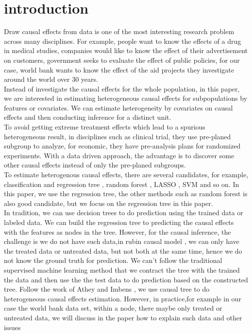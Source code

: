 \section{introduction}

Draw causal effects from data is one of the most interesting  research problem across many disciplines. For example, people want to know the effects of a drug in medical studies, companies would like to know the effect of their advertisement on customers, government seeks to evaluate the effect of public policies, for our case, world bank wants to know the effect of the aid projects they investigate around the world over 30 years. \\
Instead of investigate the causal effects for the whole population, in this paper, we are interested in estimating heterogeneous causal effects for subpopulations by features or covariates. We can estimate heterogeneity by covariates on causal effects and then conducting inference for a distinct unit.\\
To avoid getting extreme treatment effects which lead to a spurious heterogeneous result, in disciplines such as clinical trial, they use pre-planed subgroup to analyze, for economic, they have pre-analysis plans for randomized experiments. With a data driven approach, the advantage is to discover some other causal effects instead of only the pre-planed subgroups.\\
To estimate heterogenous causal effects, there are several candidates, for example, classification and regression tree  \cite{Breiman:2001:RF:570181.570182}, random forest \cite{breiman1984classification}, LASSO \cite{Tibshirani94regressionshrinkage}, SVM \cite{Vapnik1998} and so on. In this paper, we use the regression tree, the other methods such as random forest is also good candidate, but we focus on the regression tree in this paper.\\
In tradition, we can use decision trees to do prediction using the trained data or labeled data. We can build the regression tree to predicting the causal effects with the features as nodes in the tree. However, for the causal inference, the challenge is we do not have such data,in rubin causal model \cite{Imbens:2015:CIS:2764565}, we can only have the treated data or untreated data, but not both at the same time, hence we do not know the ground truth for prediction. We can't follow the traditional supervised machine learning method that we contract the tree with the trained the data and then use the the test data to do prediction based on the constructed tree. Follow the work of Athey and Imbens \cite{1504.01132}, we use causal tree to do heterogeneous causal effects estimation. However, in practice,for example in our case the world bank data set, within a node, there maybe only treated or untreated data, we will discuss in the paper how to explain such data and other issues \\

